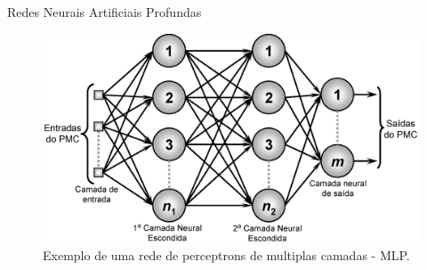 \documentclass[8pt]{beamer}
\begin{document}
\begin{frame}{Redes Neurais Artificiais Profundas}

    \begin{figure}[!ht]
        \centering
        \includegraphics[width=0.6\columnwidth]{
            Imagens/RedeNeural.PNG
        }
        \caption{Exemplo de uma rede de perceptrons de multiplas camadas - MLP.}
        \label{fig:ann}
    \end{figure}

\end{frame}
\end{document}
